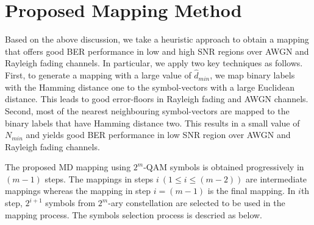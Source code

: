 \documentclass[12pt, draftclsnofoot, onecolumn]{IEEEtran}
\begin{document}
\section{Proposed Mapping Method}
\label{proposed_map}
Based on the above discussion, we take a heuristic approach to obtain a mapping that offers good BER performance in low and high  SNR regions  over AWGN and Rayleigh fading channels. In particular,  we apply two key techniques  as follows. First, to generate a mapping with a large value of $\hat{d}_{min}$, we map binary labels with the  Hamming distance one to the symbol-vectors with a large Euclidean distance. This leads to  good error-floors in  Rayleigh fading and AWGN channels. Second,  most of the nearest neighbouring  symbol-vectors are mapped to  the binary labels that have  Hamming distance two. This results in a small value of $N_{min}$ and yields  good BER performance in   low SNR region over AWGN and Rayleigh fading channels. 

The proposed MD mapping using  $2^{m}$-QAM symbols %
is obtained progressively in $(m-1)$ steps. The mappings in steps $i~(1\leq i \leq (m-2))$ are   intermediate mappings whereas the mapping in step $i=(m-1)$ is the final  mapping.  In   $i$th step,  $2^{i+1}$ symbols from $2^{m}$-ary constellation are selected to be  used in the mapping process. 
The symbols selection process is descried as below. 
\end{document}
